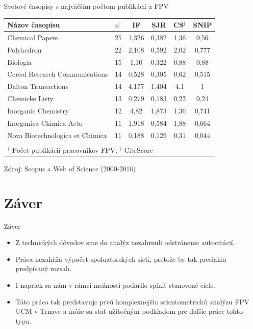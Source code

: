 \documentclass{beamer}
\begin{document}
%
%
\begin{frame}{Svetové časopisy s najväčším počtom publikácii z FPV}
\begin{table}
  {\footnotesize
  \begin{tabular}{lccccc}
    \toprule
     Názov časopisu & $n^\dagger$ & IF & SJR  & CS$^\ddagger$ & SNIP \\
    \midrule
    Chemical Papers                 & 25 & 1,326 & 0,382 & 1,36 & 0,56  \\
    Polyhedron                      & 22 & 2,108 & 0,592 & 2,02 & 0,777 \\
    Biologia                        & 15 & 1,10  & 0,322 & 0,88 & 0,88  \\
    Cereal Research Communications  & 14 & 0,528 & 0,305 & 0,62 & 0,515 \\
    Dalton Transactions             & 14 & 4,177 & 1,404 & 4,1  & 1     \\[1ex]
    Chemicke Listy                  & 13 & 0,279 & 0,183 & 0,22 & 0,24  \\
    Inorganic Chemistry             & 12 & 4,82  & 1,873 & 1,36 & 0,741 \\
    Inorganica Chimica Acta         & 11 & 1,918 & 0,584 & 1,88 & 0,664 \\
    Nova Biotechnologica et Chimica & 11 & 0,188 & 0,129 & 0,31 & 0,044 \\
    \bottomrule \\[-2ex]
    \multicolumn{6}{l}{\tiny $^\dagger$ Počet publikácií pracovníkov FPV; $^\ddagger$ CiteScore} \\
  \end{tabular}}
\end{table}
\parbox{\textwidth}{\centering\tiny Zdroj: Scopus a Web of Science (2000-2016)}
\end{frame}


\section{Záver}

\begin{frame}{Záver}
  \begin{itemize}
  \item<1-> Z technických dôvodov sme do analýz nezahrnuli odstránenie
    autocitácií.
  \item<2-> Práca nezahŕňa výpočet spoluatorských sietí, pretože by tak
    presiahla predpísaný rozsah.
  \item<3-> I napriek sa nám v rámci možností podarilo splniť stanovené ciele.
  \item<4-> Táto práca tak predstavuje prvú komplexnejšiu scientometrickú
    analýzu FPV UCM v Trnave a môže sa stať užitočným podkladom pre ďaľšie práce
    tohto typu.
  \end{itemize}
\end{frame}
\end{document}
